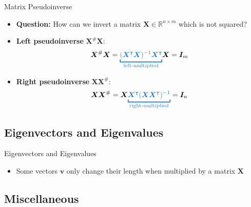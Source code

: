 \begin{frame}{Matrix Pseudoinverse}{}
	\begin{itemize}
		\item \textbf{Question:} How can we invert a matrix $\bm{X} \in \mathbb{R}^{n \times m}$ which is not squared?
		\item \textbf{Left pseudoinverse} $\bm{X}^{\#} \bm{X}$:
		\begin{equation}
			\bm{X}^{\#} \bm{X}
				= \textcolor{myblue1}{\underbracket{
					(\bm{X}^{\intercal} \bm{X})^{-1} \bm{X}^{\intercal}
				}_{\text{left-multiplied}}} \bm{X} = \bm{I}_m
		\end{equation}
		\item \textbf{Right pseudoinverse} $\bm{X} \bm{X}^{\#}$:
		\begin{equation}
			\bm{X} \bm{X}^{\#}
				= \bm{X} \textcolor{myblue1}{\underbracket{
					\bm{X}^{\intercal} (\bm{X} \bm{X}^{\intercal})^{-1}
				}_{\text{right-multiplied}}} = \bm{I}_n
		\end{equation}
	\end{itemize}
\end{frame}


\subsection{Eigenvectors and Eigenvalues}

\begin{frame}{Eigenvectors and Eigenvalues}{}
	\begin{itemize}
		\item Some vectors $\bm{v}$ only change their length when multiplied by a matrix $\bm{X}$
	\end{itemize}
\end{frame}


\subsection{Miscellaneous}


